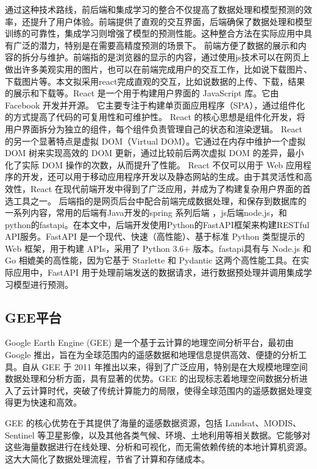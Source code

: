 \documentclass{article}
\begin{document}
	通过这种技术路线，前后端和集成学习的整合不仅提高了数据处理和模型预测的效率，还提升了用户体验。前端提供了直观的交互界面，后端确保了数据处理和模型训练的可靠性，集成学习则增强了模型的预测性能。这种整合方法在实际应用中具有广泛的潜力，特别是在需要高精度预测的场景下。
	前端方便了数据的展示和内容的拆分与维护。前端指的是浏览器的显示的内容，通过使用js技术可以在网页上做出许多美观实用的图片，也可以在前端完成用户的交互工作，比如说下载图片、下载图片等。本文拟采用react完成直观的交互，比如说数据的上传、下载，结果的展示和下载等。React 是一个用于构建用户界面的 JavaScript 库。它由 Facebook 开发并开源。
	它主要专注于构建单页面应用程序（SPA），通过组件化的方式提高了代码的可复用性和可维护性。 React 的核心思想是组件化开发，将用户界面拆分为独立的组件，每个组件负责管理自己的状态和渲染逻辑。 React 的另一个显著特点是虚拟 DOM（Virtual DOM）。它通过在内存中维护一个虚拟 DOM 树来实现高效的 DOM 更新，通过比较前后两次虚拟 DOM 的差异，最小化了实际 DOM 操作的次数，从而提升了性能。 React 不仅可以用于 Web 应用程序的开发，还可以用于移动应用程序开发以及静态网站的生成。由于其灵活性和高效性，React 在现代前端开发中得到了广泛应用，并成为了构建复杂用户界面的首选工具之一。
	后端指的是网页后台中配合前端完成数据处理，和保存到数据库的一系列内容，常用的后端有Java开发的spring 系列后端 ，js后端node.js，和python的fastapi。在本文中，后端开发使用Python的FastAPI框架来构建RESTful API服务。FastAPI 是一个现代、快速（高性能）、基于标准 Python 类型提示的 Web 框架，用于构建 APIs，采用了 Python 3.6+ 版本。fastapi具有与 Node.js 和 Go 相媲美的高性能，因为它基于 Starlette 和 Pydantic 这两个高性能工具。在实际应用中，FastAPI 用于处理前端发送的数据请求，进行数据预处理并调用集成学习模型进行预测。
	
		
	\subsection{GEE平台}
	Google Earth Engine (GEE) 是一个基于云计算的地理空间分析平台，最初由 Google 推出，旨在为全球范围内的遥感数据和地理信息提供高效、便捷的分析工具。自从 GEE 于 2011 年推出以来，得到了广泛应用，特别是在大规模地理空间数据处理和分析方面，具有显著的优势。GEE 的出现标志着地理空间数据分析进入了云计算时代，突破了传统计算能力的局限，使得全球范围内的遥感数据处理变得更为快速和高效。
	
	GEE 的核心优势在于其提供了海量的遥感数据资源，包括 Landsat、MODIS、Sentinel 等卫星影像，以及其他各类气候、环境、土地利用等相关数据。它能够对这些海量数据进行在线处理、分析和可视化，而无需依赖传统的本地计算机资源。这大大简化了数据处理流程，节省了计算和存储成本。
	
\end{document}
